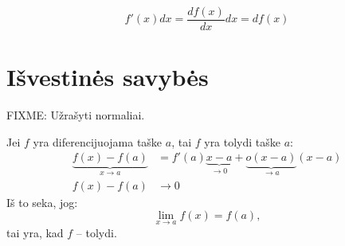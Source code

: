 \begin{note}
  \begin{equation*}
    f'(x) dx = \frac{d f(x)}{d x} d x = d f(x)
  \end{equation*}
\end{note}

\section{Išvestinės savybės}

\begin{note}
  FIXME: Užrašyti normaliai.

  Jei $f$ yra diferencijuojama taške $a$, tai $f$ yra tolydi taške $a$:
  \begin{align*}
    \underbrace{f(x) - f(a)}_{x \to a} 
      &= f'(a)\underbrace{x - a}_{\to 0} + 
      \underbrace{o(x - a)}_{\to a}(x - a) \\
    f(x) - f(a) &\to 0
  \end{align*}
  Iš to seka, jog:
  \begin{equation*}
    \lim_{x \to a} f(x) = f(a),
  \end{equation*}
  tai yra, kad $f$ – tolydi.
\end{note}

